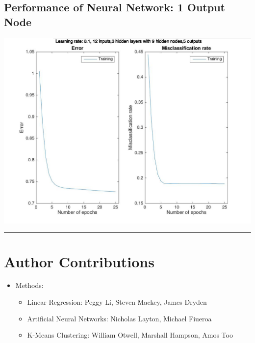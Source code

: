 \documentclass[12pt]{article}
\newcommand{\horizontalLine}{
	\begin{center}
		\hrule width 1.0\textwidth
	\end{center}
}
\begin{document}
\subsection{Performance of Neural Network: 1 Output Node}
\label{subsec:annBestPerformance}
\includegraphics[scale=0.45]{images/ann/bestRun}

\horizontalLine
\section{Author Contributions}
\label{sec:authorContributions}
\begin{itemize}
    \item Methods:
    \begin{itemize}
        \item Linear Regression: Peggy Li, Steven Mackey, James Dryden
        \item Artificial Neural Networks: Nicholas Layton, Michael Fiueroa
        \item K-Means Clustering: William Otwell, Marshall Hampson, Amos Too
    \end{itemize}
\end{itemize}
\end{document}
